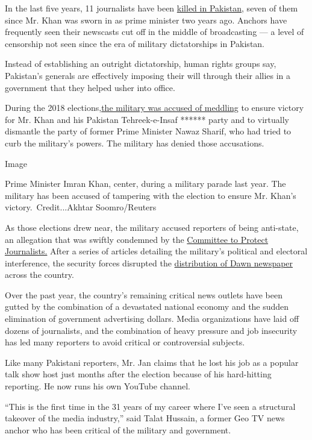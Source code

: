 In the last five years, 11 journalists have been
\href{https://cpj.org/asia/pakistan/}{killed in Pakistan}, seven of them
since Mr. Khan was sworn in as prime minister two years ago. Anchors
have frequently seen their newscasts cut off in the middle of
broadcasting --- a level of censorship not seen since the era of
military dictatorships in Pakistan.

Instead of establishing an outright dictatorship, human rights groups
say, Pakistan's generals are effectively imposing their will through
their allies in a government that they helped usher into office.

During the 2018
elections,\href{https://www.nytimes3xbfgragh.onion/2018/07/21/world/asia/pakistan-election-military.html}{the
military was accused of meddling} to ensure victory for Mr. Khan and his
Pakistan Tehreek-e-Insaf ****** party and to virtually dismantle the
party of former Prime Minister Nawaz Sharif, who had tried to curb the
military's powers. The military has denied those accusations.

Image

Prime Minister Imran Khan, center, during a military parade last year.
The military has been accused of tampering with the election to ensure
Mr. Khan's victory.~Credit...Akhtar Soomro/Reuters

As those elections drew near, the military accused reporters of being
anti-state, an allegation that was swiftly condemned by the
\href{https://cpj.org/2018/06/pakistan-army-spokesperson-accuses-journalists-of/}{Committee
to Protect Journalists.} After a series of articles detailing the
military's political and electoral interference, the security forces
disrupted the
\href{https://cpj.org/2018/05/pakistani-authorities-disrupt-distribution-of-dawn/}{distribution
of Dawn newspaper} across the country.

Over the past year, the country's remaining critical news outlets have
been gutted by the combination of a devastated national economy and the
sudden elimination of government advertising dollars. Media
organizations have laid off dozens of journalists, and the combination
of heavy pressure and job insecurity has led many reporters to avoid
critical or controversial subjects.

Like many Pakistani reporters, Mr. Jan claims that he lost his job as a
popular talk show host just months after the election because of his
hard-hitting reporting. He now runs his own YouTube channel.

``This is the first time in the 31 years of my career where I've seen a
structural takeover of the media industry,'' said Talat Hussain, a
former Geo TV news anchor who has been critical of the military and
government.

